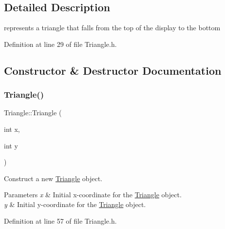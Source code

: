 \subsection{Detailed Description}
represents a triangle that falls from the top of the display to the bottom 

Definition at line 29 of file Triangle.\+h.



\subsection{Constructor \& Destructor Documentation}
\mbox{\label{class_triangle_afc6e6f7865d0dda26dd77682b2e29eeb}} 
\subsubsection{\texorpdfstring{Triangle()}{Triangle()}}
{\footnotesize\ttfamily Triangle\+::\+Triangle (\begin{DoxyParamCaption}\item[{int}]{x,  }\item[{int}]{y }\end{DoxyParamCaption})\hspace{0.3cm}{\ttfamily [inline]}}



Construct a new \mbox{\hyperlink{class_triangle}{Triangle}} object. 


\begin{DoxyParams}{Parameters}
{\em x} & Initial x-\/coordinate for the \mbox{\hyperlink{class_triangle}{Triangle}} object. \\
\hline
{\em y} & Initial y-\/coordinate for the \mbox{\hyperlink{class_triangle}{Triangle}} object. \\
\hline
\end{DoxyParams}


Definition at line 57 of file Triangle.\+h.


\begin{DoxyCode}{0}

\end{DoxyCode}


